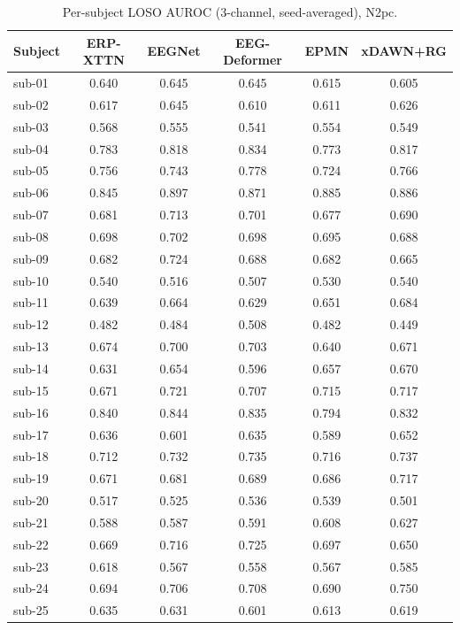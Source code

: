 \begin{table}[t]
\centering
\scriptsize
\caption{Per-subject LOSO AUROC (3-channel, seed-averaged), N2pc.}
\label{tab:persubj-n2pc}
\begin{tabular}{lccccc}
\toprule
Subject & ERP-XTTN & EEGNet & EEG-Deformer & EPMN & xDAWN+RG \\
\midrule
sub-01 & 0.640 & 0.645 & 0.645 & 0.615 & 0.605 \\
sub-02 & 0.617 & 0.645 & 0.610 & 0.611 & 0.626 \\
sub-03 & 0.568 & 0.555 & 0.541 & 0.554 & 0.549 \\
sub-04 & 0.783 & 0.818 & 0.834 & 0.773 & 0.817 \\
sub-05 & 0.756 & 0.743 & 0.778 & 0.724 & 0.766 \\
sub-06 & 0.845 & 0.897 & 0.871 & 0.885 & 0.886 \\
sub-07 & 0.681 & 0.713 & 0.701 & 0.677 & 0.690 \\
sub-08 & 0.698 & 0.702 & 0.698 & 0.695 & 0.688 \\
sub-09 & 0.682 & 0.724 & 0.688 & 0.682 & 0.665 \\
sub-10 & 0.540 & 0.516 & 0.507 & 0.530 & 0.540 \\
sub-11 & 0.639 & 0.664 & 0.629 & 0.651 & 0.684 \\
sub-12 & 0.482 & 0.484 & 0.508 & 0.482 & 0.449 \\
sub-13 & 0.674 & 0.700 & 0.703 & 0.640 & 0.671 \\
sub-14 & 0.631 & 0.654 & 0.596 & 0.657 & 0.670 \\
sub-15 & 0.671 & 0.721 & 0.707 & 0.715 & 0.717 \\
sub-16 & 0.840 & 0.844 & 0.835 & 0.794 & 0.832 \\
sub-17 & 0.636 & 0.601 & 0.635 & 0.589 & 0.652 \\
sub-18 & 0.712 & 0.732 & 0.735 & 0.716 & 0.737 \\
sub-19 & 0.671 & 0.681 & 0.689 & 0.686 & 0.717 \\
sub-20 & 0.517 & 0.525 & 0.536 & 0.539 & 0.501 \\
sub-21 & 0.588 & 0.587 & 0.591 & 0.608 & 0.627 \\
sub-22 & 0.669 & 0.716 & 0.725 & 0.697 & 0.650 \\
sub-23 & 0.618 & 0.567 & 0.558 & 0.567 & 0.585 \\
sub-24 & 0.694 & 0.706 & 0.708 & 0.690 & 0.750 \\
sub-25 & 0.635 & 0.631 & 0.601 & 0.613 & 0.619 \\

\end{tabular}
\end{table}
